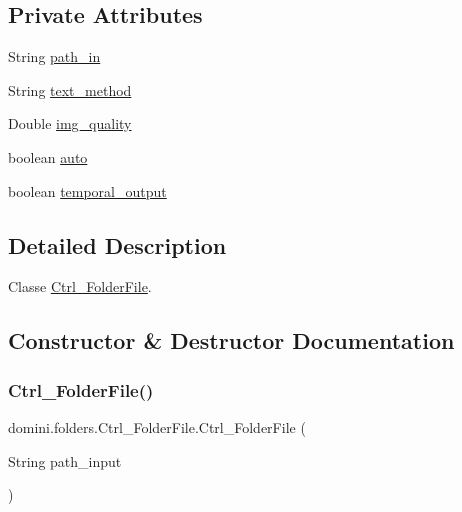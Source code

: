 \subsection*{Private Attributes}
\begin{DoxyCompactItemize}
\item 
String \hyperlink{classdomini_1_1folders_1_1Ctrl__FolderFile_a0d3946bb2832a1f34d0c2227df5c71c4}{path\+\_\+in}
\item 
String \hyperlink{classdomini_1_1folders_1_1Ctrl__FolderFile_a75ef571be454360b835f552d2cf20741}{text\+\_\+method}
\item 
Double \hyperlink{classdomini_1_1folders_1_1Ctrl__FolderFile_a7990a74c394d53a58ebbf4a7872c700d}{img\+\_\+quality}
\item 
boolean \hyperlink{classdomini_1_1folders_1_1Ctrl__FolderFile_a522ecbf2a1426984671134e062491b75}{auto}
\item 
boolean \hyperlink{classdomini_1_1folders_1_1Ctrl__FolderFile_a0db81590abe27b21a9b8c37633c86fa6}{temporal\+\_\+output}
\end{DoxyCompactItemize}


\subsection{Detailed Description}
Classe \hyperlink{classdomini_1_1folders_1_1Ctrl__FolderFile}{Ctrl\+\_\+\+Folder\+File}. 

\subsection{Constructor \& Destructor Documentation}
\mbox{\label{classdomini_1_1folders_1_1Ctrl__FolderFile_aabe2038931ca63100a2fc4b12936142d}} 
\subsubsection{\texorpdfstring{Ctrl\+\_\+\+Folder\+File()}{Ctrl\_FolderFile()}}
{\footnotesize\ttfamily domini.\+folders.\+Ctrl\+\_\+\+Folder\+File.\+Ctrl\+\_\+\+Folder\+File (\begin{DoxyParamCaption}\item[{String}]{path\+\_\+input }\end{DoxyParamCaption})\hspace{0.3cm}{\ttfamily [inline]}}



